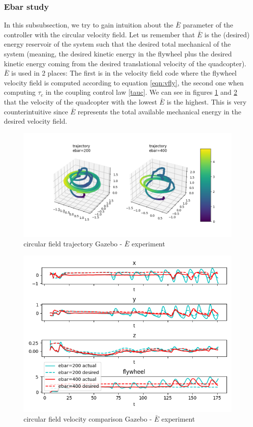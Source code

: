 \subsubsection{Ebar study}
In this subsubsection, we try to gain intuition about the $\bar{E}$ parameter of the controller with the circular velocity field.
Let us remember that $\bar{E}$ is the (desired) energy reservoir of the system such that the desired total mechanical of the system (meaning, the desired kinetic energy in the flywheel plus the desired kinetic energy coming from the desired translational velocity of the quadcopter).
$\bar{E}$ is used in 2 places: The first is in the velocity field code where the flywheel velocity field is computed according to equation \ref{eqn:vfly}, the second one when computing $\tau_c$ in the coupling control law \ref{tauc}.
We can see in figures \ref{fig:trajgazebocircularebar} and \ref{fig:velgazebocircularebar} that the velocity of the quadcopter with the lowest $\bar{E}$ is the highest.
This is very counterintuitive since $\bar{E}$ represents the total available mechanical energy in the desired velocity field.
\begin{figure}[h!]
   \centering
   \includegraphics[width=\linewidth]{Images/gazebo_trajectory_ebar_circular.png}
   \caption{circular field trajectory Gazebo - $\bar{E}$ experiment}
   \label{fig:trajgazebocircularebar}
\end{figure}
\begin{figure}[h!]
   \centering
   \includegraphics[width=\linewidth]{Images/gazebo_circular_ebar_V.png}
   \caption{circular field velocity comparison Gazebo - $\bar{E}$ experiment}
   \label{fig:velgazebocircularebar}
\end{figure}
